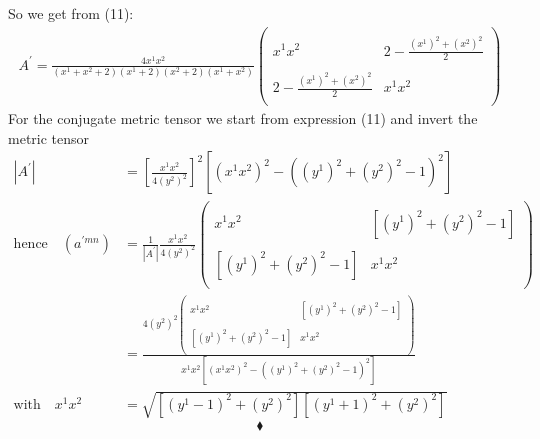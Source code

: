 So we get from (11):
\begin{align}
A^{'} =\frac{4x^1x^2}{(x^1+x^2+2)(x^1+2)(x^2+2)(x^1+x^2)} \begin{pmatrix}
\ & \\
x^1x^2 &2-\frac{(x^1)^2+(x^2)^2}{2} \\\\
2-\frac{(x^1)^2+(x^2)^2}{2}  &x^1x^2\\
\ & 
\end{pmatrix}
\end{align}
For the conjugate metric tensor we start from expression (11) and invert the metric tensor
\begin{align}
\left| A^{'}\right| &= \left[ \frac{x^1x^2}{4(y^2)^2}\right]^2\left[(x^1x^2)^2 -\left((y^1)^2 +(y^2)^2-1\right)^2\right]\\
\text{hence}\quad \left(a^{'mn}\right) &= \frac{1}{\left| A^{'}\right|}\frac{x^1x^2}{4(y^2)^2} \begin{pmatrix}
\ & \\
x^1x^2 &\left[(y^1)^2 +(y^2)^2-1\right] \\\\
\left[(y^1)^2 +(y^2)^2-1\right]  &x^1x^2\\
\ & 
\end{pmatrix}\\
\ &= \frac{4(y^2)^2\begin{pmatrix}
\ & \\
x^1x^2 &\left[(y^1)^2 +(y^2)^2-1\right] \\\\
\left[(y^1)^2 +(y^2)^2-1\right]  &x^1x^2\\
\ & 
\end{pmatrix}}{x^1x^2\left[(x^1x^2)^2 -\left((y^1)^2 +(y^2)^2-1\right)^2\right]} \\
\text{with} \quad x^1x^2&= \sqrt{\left[(y^1-1)^2 +(y^2)^2\right]\left[(y^1+1)^2 +(y^2)^2\right]}
\end{align}
$$\blacklozenge$$
\newpage

